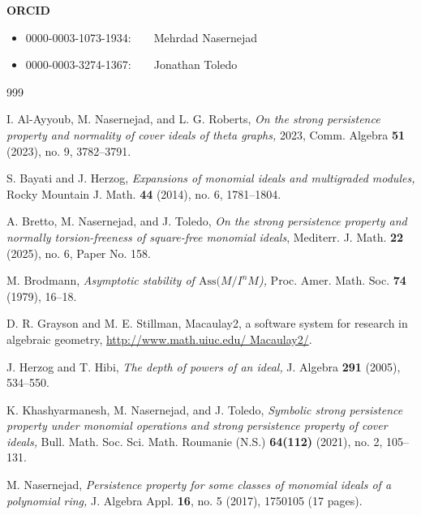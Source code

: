 \documentclass[11pt]{amsart}
\begin{document}
\bigskip
\noindent\textbf{ORCID}
\begin{itemize}
\item  {0000-0003-1073-1934:}~~~~{Mehrdad Nasernejad}
\item {0000-0003-3274-1367:}~~~~{Jonathan Toledo}
\end{itemize}
 

 




\begin{thebibliography}{999}

 
   I. Al-Ayyoub,  M. Nasernejad, and L. G. Roberts, {\it  On the strong persistence property and normality of cover
 ideals of theta graphs,} 2023,  Comm. Algebra {\bf 51} (2023), no. 9, 3782--3791.
 
  
   S.  Bayati and  J.  Herzog, \textit{Expansions of monomial ideals and multigraded modules,}  Rocky Mountain J. Math.
{\bf  44}  (2014), no. 6,  1781--1804.

   A.  Bretto,  M. Nasernejad,   and   J. Toledo, 
\textit{On the strong persistence property and normally torsion-freeness of square-free  monomial ideals}, 
 Mediterr. J. Math. \textbf{22} (2025), no. 6, Paper No. 158.


   M. Brodmann, {\it Asymptotic stability of $\mathrm{Ass}(M/I^{n}M$),}  Proc. Amer. Math. Soc. {\bf 74} (1979),  16--18.

     D. R. Grayson and  M. E. Stillman, Macaulay2, a software system for research in algebraic geometry,  
\url{http://www.math.uiuc.edu/ Macaulay2/}.


   J. Herzog and  T. Hibi,  {\it The depth of powers of  an ideal,} J. Algebra {\bf 291} (2005),  534--550.



 K. Khashyarmanesh, M. Nasernejad, and J.  Toledo, {\it Symbolic strong persistence property under monomial operations and strong persistence property of cover ideals,}  Bull. Math. Soc. Sci. Math. Roumanie (N.S.) {\bf 64(112)} (2021), no. 2, 105--131.


     M. Nasernejad, {\it Persistence property for some  classes of  monomial ideals of a polynomial ring,} J. Algebra Appl. {\bf 16}, no. 5 (2017), 
 1750105 (17 pages).



\end{thebibliography}
\end{document}
